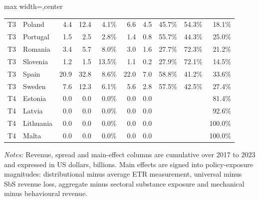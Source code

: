 \begin{table}[H]
\begin{adjustbox}{max width=\textwidth,center}
\begin{tabular}{@{}llrrrrrrrr@{}}
T3 & Poland &  4.4 &  12.4 &   4.1\% &  6.6 &  4.5 &  45.7\% &  54.3\% &  18.1\% \\
T3 & Portugal &  1.5 &   2.5 &   2.8\% &  1.4 &  0.8 &  55.7\% &  44.3\% &  25.0\% \\
T3 & Romania &  3.4 &   5.7 &   8.0\% &  3.0 &  1.6 &  27.7\% &  72.3\% &  21.2\% \\
T3 & Slovenia &  1.2 &   1.5 &  13.5\% &  1.1 &  0.2 &  27.9\% &  72.1\% &  14.5\% \\
T3 & Spain & 20.9 &  32.8 &   8.6\% & 22.0 &  7.0 &  58.8\% &  41.2\% &  33.6\% \\
T3 & Sweden &  7.6 &  12.3 &   6.1\% &  5.6 &  2.8 &  57.5\% &  42.5\% &  27.4\% \\
T4 & Estonia &  0.0 &   0.0 &   0.0\% &  0.0 &  0.0 &  &  &  81.4\% \\
T4 & Latvia &  0.0 &   0.0 &   0.0\% &  0.0 &  0.0 &  &  &  92.6\% \\
T4 & Lithuania &  0.0 &   0.0 &   0.0\% &  0.0 &  0.0 &  &  & 100.0\% \\
T4 & Malta &  0.0 &   0.0 &   0.0\% &  0.0 &  0.0 &  &  & 100.0\% \\
\bottomrule
\end{tabular}
\end{adjustbox}

\vspace{0.35em}
\noindent\begin{minipage}{\textwidth}
\footnotesize\raggedright\textit{Notes:} Revenue, spread and main-effect columns are cumulative over 2017 to 2023 and expressed in US dollars, billions. Main effects are signed into policy-exposure magnitudes: distributional minus average ETR measurement, universal minus SbS revenue loss, aggregate minus sectoral substance exposure and mechanical minus behavioural revenue.
\end{minipage}
\end{table}
